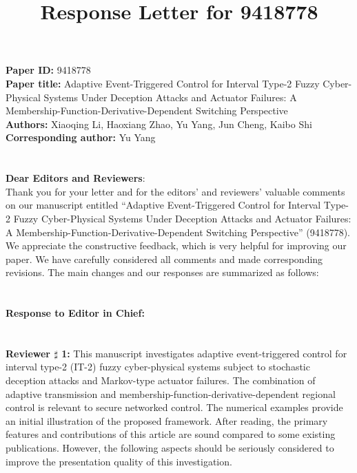 \documentclass[10pt,fleqn]{article}
\date{}
\begin{document}
\title{\bf Response Letter for 9418778}
\author{}
\date{}
\maketitle
\noindent \textbf{Paper ID:} 9418778 \\
\textbf{Paper title:} Adaptive Event-Triggered Control for Interval Type-2 Fuzzy Cyber-Physical Systems Under Deception Attacks and Actuator Failures: A Membership-Function-Derivative-Dependent Switching Perspective\\
\textbf{Authors:} Xiaoqing Li, Haoxiang Zhao, Yu Yang, Jun Cheng, Kaibo Shi \\
\textbf{Corresponding author:} Yu Yang
\\
\\
\\
\noindent \textbf{Dear Editors and Reviewers}: \\
\indent Thank you for your letter and for the editors’ and reviewers’ valuable comments on our manuscript entitled
“Adaptive Event-Triggered Control for Interval Type-2 Fuzzy Cyber-Physical Systems Under Deception Attacks and Actuator Failures: A Membership-Function-Derivative-Dependent Switching Perspective” (9418778). We appreciate the constructive feedback, which is very helpful for improving our paper. We have carefully considered all comments and made corresponding revisions. The main changes and our responses are summarized as follows:
\\
~\\
\\
\textbf{Response to  Editor in Chief:}\\[10pt]
\makebox[\linewidth][l]{*****************************************************************************************}\\
\\
\hspace*{-0.5cm}\indent\textbf{Reviewer $\sharp$ 1:} This manuscript investigates adaptive event-triggered control for interval type-2 (IT-2) fuzzy cyber-physical systems subject to stochastic deception attacks and Markov-type actuator failures. The combination of adaptive transmission and membership-function-derivative-dependent regional control is relevant to secure networked control. The numerical examples provide an initial illustration of the proposed framework. After reading, the primary features and contributions of this article are sound compared to some existing publications. However, the following aspects should be seriously considered to improve the presentation quality of this investigation.
\end{document}
